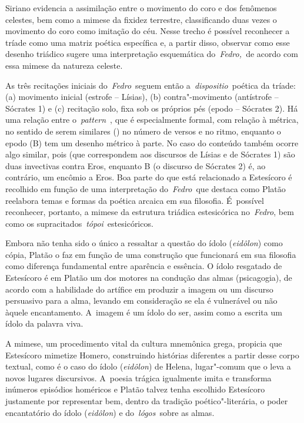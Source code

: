  

Siriano evidencia a assimilação entre o movimento do coro e dos
fenômenos celestes, bem como a mimese da fixidez terrestre,
classificando duas vezes o movimento do coro como imitação do céu. Nesse
trecho é possível reconhecer a tríade como uma matriz poética específica
e, a partir disso, observar como esse desenho triádico sugere uma
interpretação esquemática do~\emph{Fedro,~}de acordo com essa mimese da
natureza celeste.

As três recitações iniciais do~\emph{Fedro}~seguem então
a~\emph{dispositio}~poética da tríade: (a) movimento inicial (estrofe --
Lísias), (b) contra"-movimento (antístrofe -- Sócrates 1) e (c) recitação
solo, fixa sob os próprios pés (epodo -- Sócrates 2). Há uma relação
entre o~\emph{pattern}~, que é especialmente formal, com relação à
métrica, no sentido de serem similares () no número de versos e no
ritmo, enquanto o epodo (B) tem um desenho métrico à parte. No caso do
conteúdo também ocorre algo similar, pois  (que correspondem aos
discursos de Lísias e de Sócrates 1) são duas invectivas contra Eros,
enquanto B (o discurso de Sócrates 2) é, ao contrário, um encômio a
Eros. Boa parte do que está relacionado a Estesícoro é recolhido em
função de uma interpretação do~\emph{Fedro~}que destaca como Platão
reelabora temas e formas da poética arcaica em sua filosofia. É~possível
reconhecer, portanto, a mimese da estrutura triádica estesicórica
no~\emph{Fedro}, bem como os supracitados~\emph{tópoi}~estesicóricos.

Embora não tenha sido o único a ressaltar a questão do ídolo
(\emph{eidôlon}) como cópia, Platão o faz em função de uma construção
que funcionará em sua filosofia como diferença fundamental entre
aparência e essência. O ídolo resgatado de Estesícoro é em Platão um dos
motores na condução das almas (psicagogia), de acordo com a habilidade
do artífice em produzir a imagem ou um discurso persuasivo para a alma,
levando em consideração se ela é vulnerável ou não àquele encantamento.
A~imagem é um ídolo do ser, assim como a escrita um ídolo da palavra
viva.

A mimese, um procedimento vital da cultura mnemônica grega, propicia que
Estesícoro mimetize Homero, construindo histórias diferentes a partir
desse corpo textual, como é o caso do ídolo (\emph{eidôlon}) de Helena,
lugar"-comum que o leva a novos lugares discursivos. A~poesia trágica
igualmente imita e transforma inúmeros episódios homéricos e Platão
talvez tenha escolhido Estesícoro justamente por representar bem, dentro
da tradição poético"-literária, o poder encantatório do ídolo
(\emph{eidôlon}) e do~\emph{lógos}~sobre as almas.

